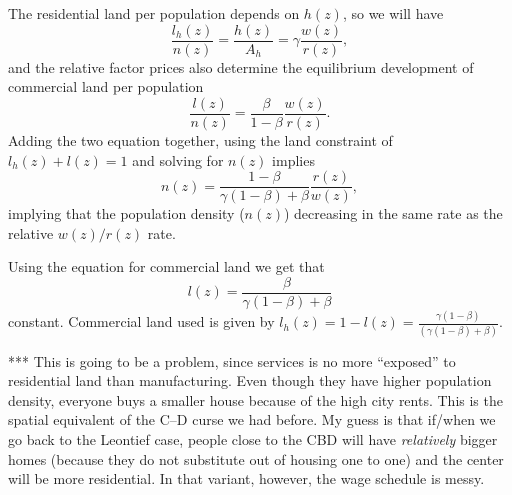 \documentclass[10pt]{article}
\begin{document}
The residential land per population depends on $h(z)$, so we will have
\begin{equation*}
\frac{l_h(z)}{n(z)}=\frac{h(z)}{A_h}=\gamma\frac{w(z)}{r(z)},
\end{equation*}
and the relative factor prices also determine the equilibrium development of commercial land per population
\begin{equation*}
\frac{l(z)}{n(z)}=\frac{\beta}{1-\beta}\frac{w(z)}{r(z)}. 
\end{equation*}
Adding the two equation together, using the land constraint of $l_h(z)+l(z)=1$ and solving for $n(z)$ implies
\begin{equation}
n(z)=\frac{1-\beta}{\gamma(1-\beta)+\beta}\frac{r(z)}{w(z)},
\end{equation}
implying that the population density ($n(z)$) decreasing in the same rate as the relative $w(z)/r(z)$ rate. 

Using the equation for commercial land we get that 
\begin{equation}
l(z)=\frac{\beta}{\gamma(1-\beta)+\beta}
\end{equation}
constant. Commercial land used is given by $l_h(z)=1-l(z)=\frac{\gamma(1-\beta)}{(\gamma(1-\beta)+\beta)}$. 

*** This is going to be a problem, since services is no more ``exposed'' to residential land than manufacturing. Even though they have higher population density, everyone buys a smaller house because of the high city rents. This is the spatial equivalent of the C--D curse we had before. My guess is that if/when we go back to the Leontief case, people close to the CBD will have \emph{relatively} bigger homes (because they do not substitute out of housing one to one) and the center will be more residential. In that variant, however, the wage schedule is messy. 
\end{document}
